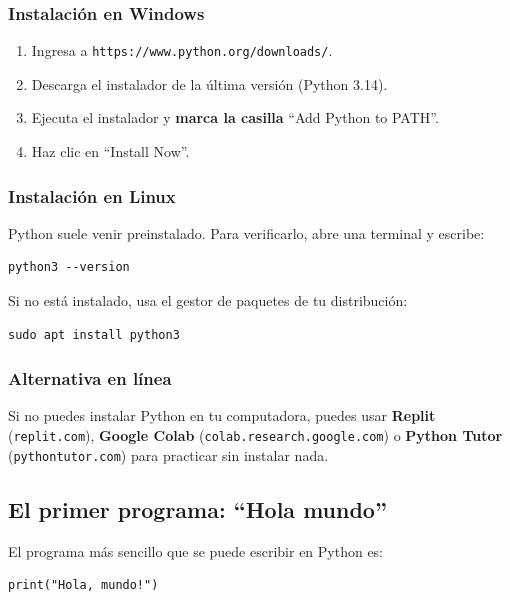 \documentclass[11pt,a4paper]{article}
\begin{document}
\subsubsection{Instalación en Windows}
\begin{enumerate}
    \item Ingresa a \texttt{https://www.python.org/downloads/}.
    \item Descarga el instalador de la última versión (Python 3.14).
    \item Ejecuta el instalador y \textbf{marca la casilla} ``Add Python to PATH''.
    \item Haz clic en ``Install Now''.
\end{enumerate}

\subsubsection{Instalación en Linux}
Python suele venir preinstalado. Para verificarlo, abre una terminal y escribe:

\begin{lstlisting}[style=pythonStyle]
python3 --version
\end{lstlisting}

Si no está instalado, usa el gestor de paquetes de tu distribución:

\begin{lstlisting}[style=pythonStyle]
sudo apt install python3
\end{lstlisting}

\subsubsection{Alternativa en línea}

Si no puedes instalar Python en tu computadora, puedes usar \textbf{Replit} (\texttt{replit.com}), \textbf{Google Colab} (\texttt{colab.research.google.com}) o \textbf{Python Tutor} (\texttt{pythontutor.com}) para practicar sin instalar nada.

\subsection{El primer programa: ``Hola mundo''}

El programa más sencillo que se puede escribir en Python es:

\begin{lstlisting}[style=pythonStyle, caption={Nuestro primer programa}]
print("Hola, mundo!")
\end{lstlisting}
\end{document}
